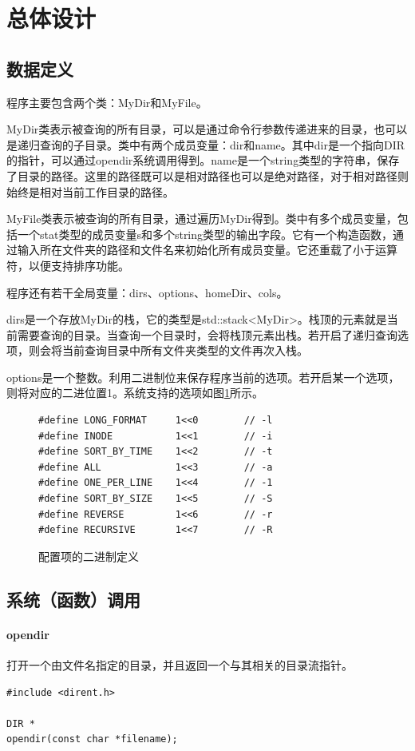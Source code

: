 \documentclass[UTF8,zihao=5,AutoFakeBold]{ctexart}
\begin{document}
\newpage
\section{总体设计}
\subsection{数据定义}

程序主要包含两个类：MyDir和MyFile。

MyDir类表示被查询的所有目录，可以是通过命令行参数传递进来的目录，也可以是递归查询的子目录。类中有两个成员变量：dir和name。其中dir是一个指向DIR的指针，可以通过opendir系统调用得到。name是一个string类型的字符串，保存了目录的路径。这里的路径既可以是相对路径也可以是绝对路径，对于相对路径则始终是相对当前工作目录的路径。

MyFile类表示被查询的所有目录，通过遍历MyDir得到。类中有多个成员变量，包括一个stat类型的成员变量s和多个string类型的输出字段。它有一个构造函数，通过输入所在文件夹的路径和文件名来初始化所有成员变量。它还重载了小于运算符，以便支持排序功能。

程序还有若干全局变量：dirs、options、homeDir、cols。

dirs是一个存放MyDir的栈，它的类型是std::stack<MyDir>。栈顶的元素就是当前需要查询的目录。当查询一个目录时，会将栈顶元素出栈。若开启了递归查询选项，则会将当前查询目录中所有文件夹类型的文件再次入栈。

options是一个整数。利用二进制位来保存程序当前的选项。若开启某一个选项，则将对应的二进位置1。系统支持的选项如图\ref{fig:options}所示。

\begin{figure}[h]
    \begin{lstlisting}
#define LONG_FORMAT     1<<0        // -l
#define INODE           1<<1        // -i
#define SORT_BY_TIME    1<<2        // -t
#define ALL             1<<3        // -a
#define ONE_PER_LINE    1<<4        // -1
#define SORT_BY_SIZE    1<<5        // -S
#define REVERSE         1<<6        // -r
#define RECURSIVE       1<<7        // -R
    \end{lstlisting}
    \caption{配置项的二进制定义}
    \label{fig:options}
\end{figure}
\subsection{系统（函数）调用}

\paragraph{opendir\cite{DIRECTORY}}
打开一个由文件名指定的目录，并且返回一个与其相关的目录流指针。
\begin{lstlisting}[numbers=none]
#include <dirent.h>

DIR *
opendir(const char *filename);
\end{lstlisting}
\end{document}
